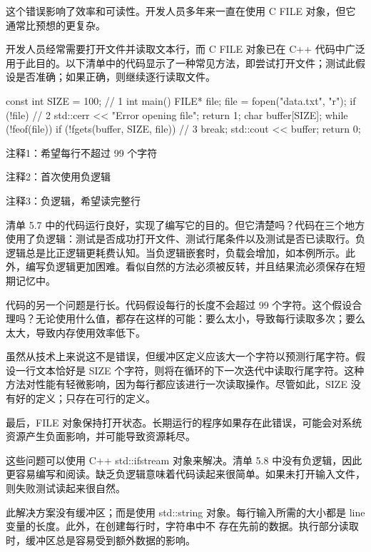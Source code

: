 这个错误影响了效率和可读性。开发人员多年来一直在使用 C FILE 对象，但它通常比预想的更复杂。


开发人员经常需要打开文件并读取文本行，而 C FILE 对象已在 C++ 代码中广泛用于此目的。以下清单中的代码显示了一种常见方法，即尝试打开文件；测试此假设是否准确；如果正确，则继续逐行读取文件。


\begin{cpp}
const int SIZE = 100; // 1
int main() {
  FILE* file;
  file = fopen("data.txt", "r");
  if (!file) { // 2
    std::cerr << "Error opening file\n";
    return 1;
  }
  char buffer[SIZE];
  while (!feof(file)) {
    if (!fgets(buffer, SIZE, file)) // 3
      break;
    std::cout << buffer;
  }
  return 0;
}
\end{cpp}

{\footnotesize
注释1：希望每行不超过 99 个字符

注释2：首次使用负逻辑

注释3：负逻辑，希望读完整行
}


清单 5.7 中的代码运行良好，实现了编写它的目的。但它清楚吗？代码在三个地方使用了负逻辑：测试是否成功打开文件、测试行尾条件以及测试是否已读取行。负逻辑总是比正逻辑更耗费认知。当负逻辑嵌套时，负载会增加，如本例所示。此外，编写负逻辑更加困难。看似自然的方法必须被反转，并且结果流必须保存在短期记忆中。

代码的另一个问题是行长。代码假设每行的长度不会超过 99 个字符。这个假设合理吗？无论使用什么值，都存在这样的可能：要么太小，导致每行读取多次；要么太大，导致内存使用效率低下。

虽然从技术上来说这不是错误，但缓冲区定义应该大一个字符以预测行尾字符。假设一行文本恰好是 SIZE 个字符，则将在循环的下一次迭代中读取行尾字符。这种方法对性能有轻微影响，因为每行都应该进行一次读取操作。尽管如此，SIZE 没有好的定义；只存在可行的定义。

最后，FILE 对象保持打开状态。长期运行的程序如果存在此错误，可能会对系统资源产生负面影响，并可能导致资源耗尽。


这些问题可以使用 C++ std::ifstream 对象来解决。清单 5.8 中没有负逻辑，因此更容易编写和阅读。缺乏负逻辑意味着代码读起来很简单。如果未打开输入文件，则失败测试读起来很自然。

此解决方案没有缓冲区；而是使用 std::string 对象。每行输入所需的大小都是 line 变量的长度。此外，在创建每行时，字符串中不 存在先前的数据。执行部分读取时，缓冲区总是容易受到额外数据的影响。

